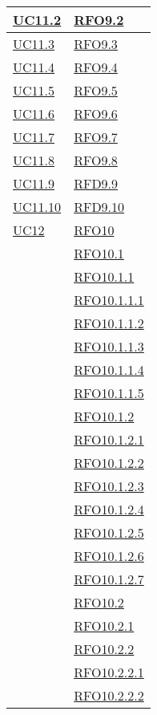\begin{longtable}{|>{\centering}m{5cm}|m{5cm}<{\centering}|}
\hyperlink{UC11.2}{UC11.2} & \hyperlink{RFO9.2}{RFO9.2}\\\hline
\hyperlink{UC11.3}{UC11.3} & \hyperlink{RFO9.3}{RFO9.3}\\\hline
\hyperlink{UC11.4}{UC11.4} & \hyperlink{RFO9.4}{RFO9.4}\\\hline
\hyperlink{UC11.5}{UC11.5} & \hyperlink{RFO9.5}{RFO9.5}\\\hline
\hyperlink{UC11.6}{UC11.6} & \hyperlink{RFO9.6}{RFO9.6}\\\hline
\hyperlink{UC11.7}{UC11.7} & \hyperlink{RFO9.7}{RFO9.7}\\\hline
\hyperlink{UC11.8}{UC11.8} & \hyperlink{RFO9.8}{RFO9.8}\\\hline
\hyperlink{UC11.9}{UC11.9} & \hyperlink{RFD9.9}{RFD9.9}\\\hline
\hyperlink{UC11.10}{UC11.10} & \hyperlink{RFD9.10}{RFD9.10}\\\hline
\hyperlink{UC12}{UC12} & \hyperlink{RFO10}{RFO10}\\
& \hyperlink{RFO10.1}{RFO10.1}\\
& \hyperlink{RFO10.1.1}{RFO10.1.1}\\
& \hyperlink{RFO10.1.1.1}{RFO10.1.1.1}\\
& \hyperlink{RFO10.1.1.2}{RFO10.1.1.2}\\
& \hyperlink{RFO10.1.1.3}{RFO10.1.1.3}\\
& \hyperlink{RFO10.1.1.4}{RFO10.1.1.4}\\
& \hyperlink{RFO10.1.1.5}{RFO10.1.1.5}\\
& \hyperlink{RFO10.1.2}{RFO10.1.2}\\
& \hyperlink{RFO10.1.2.1}{RFO10.1.2.1}\\
& \hyperlink{RFO10.1.2.2}{RFO10.1.2.2}\\
& \hyperlink{RFO10.1.2.3}{RFO10.1.2.3}\\
& \hyperlink{RFO10.1.2.4}{RFO10.1.2.4}\\
& \hyperlink{RFO10.1.2.5}{RFO10.1.2.5}\\
& \hyperlink{RFO10.1.2.6}{RFO10.1.2.6}\\
& \hyperlink{RFO10.1.2.7}{RFO10.1.2.7}\\
& \hyperlink{RFO10.2}{RFO10.2}\\
& \hyperlink{RFO10.2.1}{RFO10.2.1}\\
& \hyperlink{RFO10.2.2}{RFO10.2.2}\\
& \hyperlink{RFO10.2.2.1}{RFO10.2.2.1}\\
& \hyperlink{RFO10.2.2.2}{RFO10.2.2.2}\\

\end{longtable}
